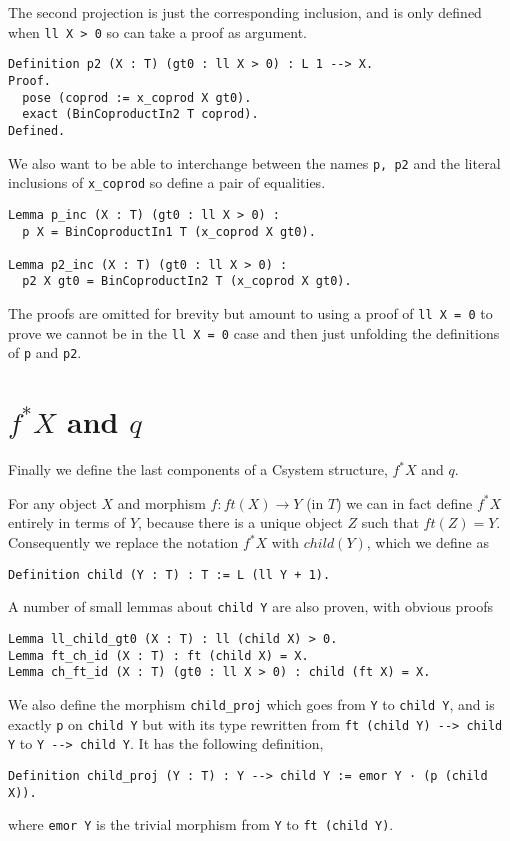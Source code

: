 The second projection is just the corresponding inclusion, and is only defined
when \lstinline|ll X > 0| so can take a proof as argument.
\begin{lstlisting}
Definition p2 (X : T) (gt0 : ll X > 0) : L 1 --> X.
Proof.
  pose (coprod := x_coprod X gt0).
  exact (BinCoproductIn2 T coprod).
Defined.
\end{lstlisting}

We also want to be able to interchange between the names \lstinline|p, p2| and the
literal inclusions of \lstinline|x_coprod| so define a pair of equalities.
\begin{lstlisting}
Lemma p_inc (X : T) (gt0 : ll X > 0) :
  p X = BinCoproductIn1 T (x_coprod X gt0).

Lemma p2_inc (X : T) (gt0 : ll X > 0) : 
  p2 X gt0 = BinCoproductIn2 T (x_coprod X gt0).
\end{lstlisting}
The proofs are omitted for brevity but amount to using a proof of 
\lstinline|ll X = 0| to prove we cannot be in the \lstinline|ll X = 0| case and 
then just unfolding the definitions of \lstinline|p| and \lstinline|p2|.

\section{$f^*X$ and $q$}
Finally we define the last components of a Csystem structure, $f^*X$ and $q$.

For any object $X$ and morphism $f : ft(X)\to Y$ (in $T$) we can in fact define
$f^*X$ entirely in terms of $Y$, because there is a unique object $Z$ such that
$ft(Z) = Y$. Consequently we replace the notation $f^*X$ with $child(Y)$, which
we define as
\begin{lstlisting}
Definition child (Y : T) : T := L (ll Y + 1).
\end{lstlisting}

A number of small lemmas about \lstinline|child Y| are also proven, with obvious
proofs
\begin{lstlisting}
Lemma ll_child_gt0 (X : T) : ll (child X) > 0.
Lemma ft_ch_id (X : T) : ft (child X) = X.
Lemma ch_ft_id (X : T) (gt0 : ll X > 0) : child (ft X) = X.
\end{lstlisting}

We also define the morphism \lstinline|child_proj| which goes from \lstinline|Y|
to \lstinline|child Y|, and is exactly \lstinline|p| on \lstinline|child Y| but
with its type rewritten from \lstinline|ft (child Y) --> child Y| to
\lstinline|Y --> child Y|. It has the following definition,
\begin{lstlisting}
Definition child_proj (Y : T) : Y --> child Y := emor Y · (p (child X)).
\end{lstlisting}
where \lstinline|emor Y| is the trivial morphism from \lstinline|Y| to 
\lstinline|ft (child Y)|.

